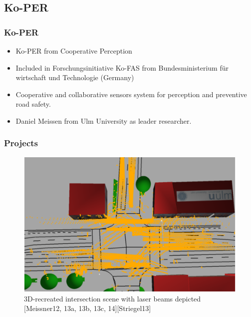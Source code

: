 \documentclass[table]{beamer}
\begin{document}
\subsection{Ko-PER}
\frame
{
	\frametitle{Ko-PER}
	\begin{itemize}
		\item Ko-PER from Cooperative Perception
		\item Included in Forschungsinitiative Ko-FAS from Bundesministerium für wirtschaft und Technologie (Germany)
		\item Cooperative and collaborative sensors system for perception and preventive road safety.
		\item Daniel Meissen from Ulm University as leader researcher.
	\end{itemize}
}
\frame
{
	\frametitle{Projects}	
	\begin{figure}
		\includegraphics[scale=0.4]{fig/meiss1.png}
		\caption{3D-recreated intersection scene with laser beams depicted [Meissner12, 13a, 13b, 13c, 14][Striegel13]}
	\end{figure}
}
\end{document}
